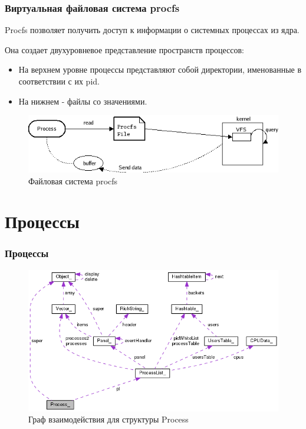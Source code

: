 \documentclass{beamer}
\begin{document}
\begin{frame}
\frametitle{Виртуальная файловая система procfs}

Procfs позволяет получить доступ к информации о системных процессах из ядра.

Она создает двухуровневое представление пространств процессов:
\begin{itemize}
\item На верхнем уровне процессы представляют собой директории, именованные в соответствии с их pid.
\item На нижнем - файлы со значениями.
\end{itemize}

\begin{figure}
\includegraphics[scale=0.6]{res/ProcessFileSystem}
\caption{Файловая система procfs}
\end{figure}

\end{frame}

\section{Процессы}

\begin{frame}
\frametitle{Процессы}

\begin{figure}
\includegraphics[scale=0.47]{res/process.png}
\caption{Граф взаимодействия для структуры Process}
\end{figure}

\end{frame}
\end{document}
